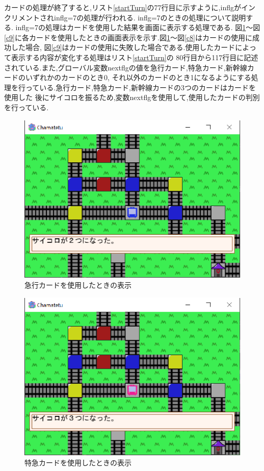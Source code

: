 \documentclass[a4j]{jarticle}
\begin{document}
        カードの処理が終了すると,リスト\ref{startTurn}の77行目に示すように,inflgがインクリメントされinflg=7の処理が行われる.
        inflg=7のときの処理について説明する. inflg=7の処理はカードを使用した結果を画面に表示する処理である. 
        図\ref{c1}～図\ref{c9}に各カードを使用したときの画面表示を示す.図\ref{c1}～図\ref{c8}はカードの使用に成功した場合,
        図\ref{c9}はカードの使用に失敗した場合である.使用したカードによって表示する内容が変化する処理はリスト\ref{startTurn}の
        80行目から117行目に記述されている.また,グローバル変数nextflgの値を急行カード,特急カード,新幹線カードのいずれかのカードのとき0,
        それ以外のカードのとき1になるようにする処理を行っている.急行カード,特急カード,新幹線カードの3つのカードはカードを使用した
        後にサイコロを振るため,変数nextflgを使用して,使用したカードの判別を行っている.

        \begin{figure}[H]
            \centering
            \includegraphics[scale=1.3]{kyukou.eps}
            \caption{急行カードを使用したときの表示}
             \label{c1}
            \end{figure}   

        \begin{figure}[H]
            \centering
            \includegraphics[scale=1.3]{tokkyu.eps}
            \caption{特急カードを使用したときの表示}
             \label{c2}
            \end{figure}  
\end{document}
